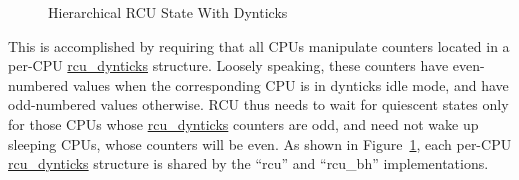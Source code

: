 \begin{figure}[htb]
\begin{center}
\end{center}
\caption{Hierarchical RCU State With Dynticks}
\label{fig:app:rcuimpl:rcutree:Hierarchical RCU State With Dynticks}
\end{figure}

This is accomplished by requiring that all CPUs manipulate counters
located in a per-CPU \url{rcu_dynticks} structure.
Loosely speaking, these counters have even-numbered values when the
corresponding CPU is in dynticks idle mode, and have odd-numbered values
otherwise.
RCU thus needs to wait for quiescent states only for those CPUs whose
\url{rcu_dynticks} counters are odd, and need not wake up sleeping
CPUs, whose counters will be even.
As shown in
Figure~\ref{fig:app:rcuimpl:rcutree:Hierarchical RCU State With Dynticks},
each per-CPU \url{rcu_dynticks} structure
is shared by the ``rcu'' and ``rcu\_bh'' implementations.

